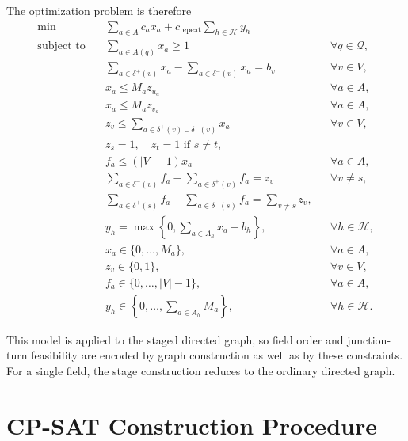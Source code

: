 \documentclass{article}
\begin{document}
The optimization problem is therefore
$$
\begin{aligned}
\min \quad
&
\sum_{a\in A}c_a x_a
+c_{\mathrm{repeat}}\sum_{h\in\mathcal{H}}y_h
\\[2mm]
\text{subject to}\quad
&
\sum_{a\in A(q)}x_a \geq 1
&&
\forall q\in\mathcal{Q},
\\[2mm]
&
\sum_{a\in\delta^+(v)}x_a
-
\sum_{a\in\delta^-(v)}x_a
=
b_v
&&
\forall v\in V,
\\[2mm]
&
x_a\leq M_a z_{u_a}
&&
\forall a\in A,
\\
&
x_a\leq M_a z_{v_a}
&&
\forall a\in A,
\\
&
z_v
\leq
\sum_{a\in\delta^+(v)\cup\delta^-(v)}x_a
&&
\forall v\in V,
\\
&
z_s=1,\quad z_t=1\text{ if }s\neq t,
&&
\\
&
f_a\leq(|V|-1)x_a
&&
\forall a\in A,
\\
&
\sum_{a\in\delta^-(v)}f_a
-
\sum_{a\in\delta^+(v)}f_a
=
z_v
&&
\forall v\neq s,
\\
&
\sum_{a\in\delta^+(s)}f_a
-
\sum_{a\in\delta^-(s)}f_a
=
\sum_{v\neq s}z_v,
\\[2mm]
&
y_h=\max\!\left\{0,\sum_{a\in A_h}x_a-b_h\right\},
&&
\forall h\in\mathcal{H},
\\[2mm]
&
x_a\in\{0,\ldots,M_a\},
&&
\forall a\in A,
\\
&
z_v\in\{0,1\},
&&
\forall v\in V,
\\
&
f_a\in\{0,\ldots,|V|-1\},
&&
\forall a\in A,
\\
&
y_h\in\left\{0,\ldots,\sum_{a\in A_h}M_a\right\},
&&
\forall h\in\mathcal{H}.
\end{aligned}
$$

This model is applied to the staged directed graph, so field order and junction-turn feasibility are encoded by graph construction as well as by these constraints. For a single field, the stage construction reduces to the ordinary directed graph.

\section{CP-SAT Construction Procedure}
\end{document}
